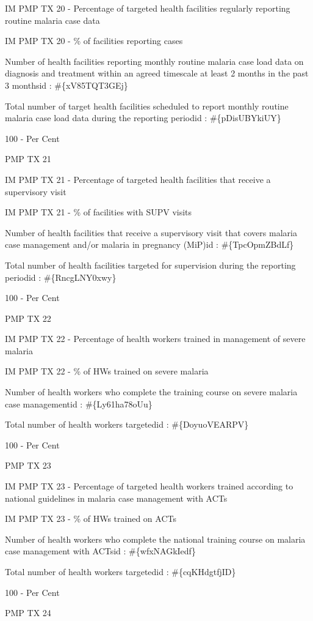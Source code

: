 \documentclass[]{book}
\begin{document}
IM PMP TX 20 - Percentage of targeted health facilities regularly reporting routine malaria case data

IM PMP TX 20 - \% of facilities reporting cases

Number of health facilities reporting monthly routine malaria case load data on diagnosis and treatment within an agreed timescale at least 2 months in the past 3 monthsid : \#\{xV85TQT3GEj\}

Total number of target health facilities scheduled to report monthly routine malaria case load data during the reporting periodid : \#\{pDisUBYkiUY\}

100 - Per Cent

PMP TX 21

IM PMP TX 21 - Percentage of targeted health facilities that receive a supervisory visit

IM PMP TX 21 - \% of facilities with SUPV visits

Number of health facilities that receive a supervisory visit that covers malaria case management and/or malaria in pregnancy (MiP)id : \#\{TpcOpmZBdLf\}

Total number of health facilities targeted for supervision during the reporting periodid : \#\{RncgLNY0xwy\}

100 - Per Cent

PMP TX 22

IM PMP TX 22 - Percentage of health workers trained in management of severe malaria

IM PMP TX 22 - \% of HWs trained on severe malaria

Number of health workers who complete the training course on severe malaria case managementid : \#\{Ly61ha78oUu\}

Total number of health workers targetedid : \#\{DoyuoVEARPV\}

100 - Per Cent

PMP TX 23

IM PMP TX 23 - Percentage of targeted health workers trained according to national guidelines in malaria case management with ACTs

IM PMP TX 23 - \% of HWs trained on ACTs

Number of health workers who complete the national training course on malaria case management with ACTsid : \#\{wfxNAGkIedf\}

Total number of health workers targetedid : \#\{cqKHdgtfjID\}

100 - Per Cent

PMP TX 24
\end{document}
